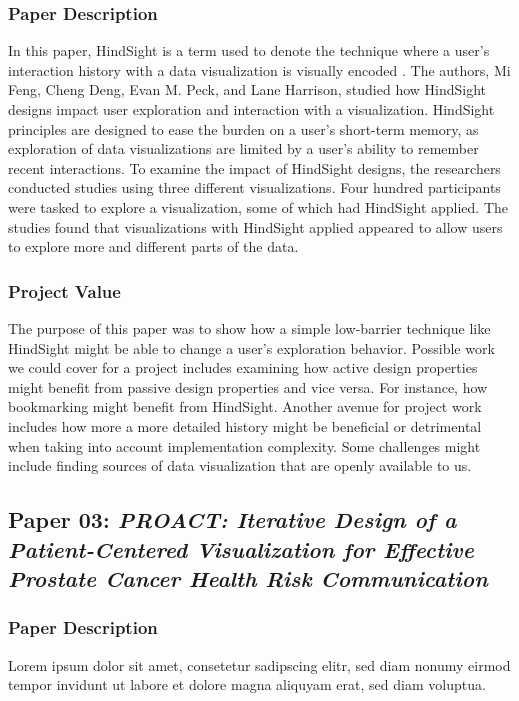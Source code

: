 \documentclass[journal]{vgtc}                %
\begin{document}
        \subsubsection{Paper Description}
        In this paper, HindSight is a term used to denote the technique where a user's interaction history with a data visualization is visually encoded \cite[p.~1]{HindSight:2016}.
        The authors, Mi Feng, Cheng Deng, Evan M. Peck, and Lane Harrison, studied how HindSight designs impact user exploration and interaction with a visualization.
        HindSight principles are designed to ease the burden on a user's short-term memory, as exploration of data visualizations are limited by a user's ability to remember recent interactions.
        To examine the impact of HindSight designs, the researchers conducted studies using three different visualizations.
        Four hundred participants were tasked to explore a visualization, some of which had HindSight applied.
        The studies found that visualizations with HindSight applied appeared to allow users to explore more and different parts of the data.

        \subsubsection{Project Value}
        The purpose of this paper was to show how a simple low-barrier technique like HindSight might be able to change a user's exploration behavior.
        Possible work we could cover for a project includes examining how active design properties might benefit from passive design properties and vice versa.
        For instance, how bookmarking might benefit from HindSight.
        Another avenue for project work includes how more a more detailed history might be beneficial or detrimental when taking into account implementation complexity.
        Some challenges might include finding sources of data visualization that are openly available to us.


    \subsection{Paper 03: \textit{PROACT: Iterative Design of a Patient-Centered Visualization for Effective Prostate Cancer Health Risk Communication} \cite{PROACT:2016}}
        \subsubsection{Paper Description}
        Lorem ipsum dolor sit amet, consetetur sadipscing elitr, sed diam nonumy eirmod tempor invidunt ut labore et dolore magna aliquyam erat, sed diam voluptua.
\end{document}
